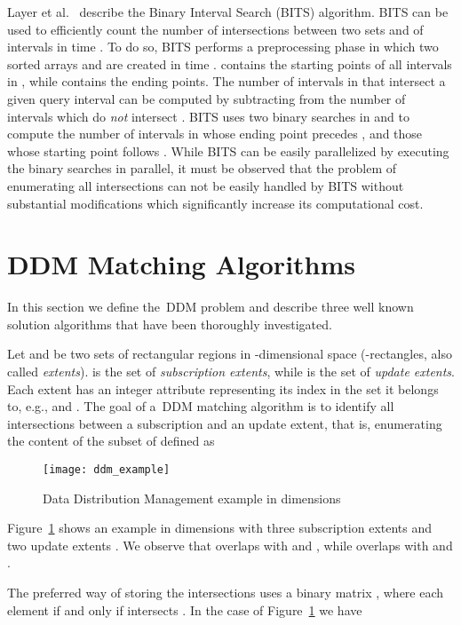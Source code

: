 \documentclass[10pt, conference, compsocconf]{IEEEtran}
\begin{document}
Layer et al.~\cite{Layer2012} describe the Binary Interval Search
(BITS) algorithm. BITS can be used to efficiently count the number of
intersections between two sets  and  of intervals in time
. To do so, BITS performs a
preprocessing phase in which two sorted arrays  and  are
created in time .  contains the starting points
of all intervals in , while  contains the ending points. The
number of intervals in  that intersect a given query interval  can be computed by subtracting from
 the number of intervals which do \emph{not} intersect . BITS
uses two binary searches in  and  to compute the number of
intervals in  whose ending point precedes , and
those whose starting point follows . While BITS can
be easily parallelized by executing the binary searches in parallel,
it must be observed that the problem of enumerating all intersections
can not be easily handled by BITS without substantial modifications
which significantly increase its computational cost.


\section{DDM Matching Algorithms}\label{sec:ddm-algorithms}

In this section we define the~\ac{DDM} problem and describe three well
known solution algorithms that have been thoroughly investigated.

Let  and  be two sets of rectangular regions in -dimensional space
(-rectangles, also called \emph{extents}).  is the set
of \emph{subscription extents}, while  is the set of
\emph{update extents}. Each extent  has an integer attribute
 representing its index in the set it belongs to, e.g.,
 and . The goal of
a~\ac{DDM} matching algorithm is to identify all intersections between
a subscription and an update extent, that is, enumerating the content
of the subset of  defined as


\begin{figure}[t]
\centering\texttt{[image: ddm\_example]}
\caption{Data Distribution Management example in  dimensions}\label{fig:ddm_example}
\end{figure}

Figure~\ref{fig:ddm_example} shows an example in  dimensions with
three subscription extents  and two update extents
. We observe that  overlaps with  and ,
while  overlaps with  and .

The preferred way of storing the intersections uses a 
binary matrix , where each element  if and
only if  intersects . In the case of
Figure~\ref{fig:ddm_example} we have
\end{document}
